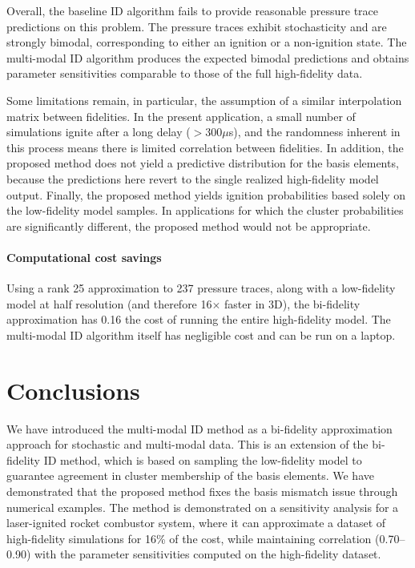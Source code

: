 \documentclass[preprint,10pt]{elsarticle}
\begin{document}
Overall, the baseline ID algorithm fails to provide reasonable pressure trace predictions on this problem. The pressure traces exhibit stochasticity and are strongly bimodal, corresponding to either an ignition or a non-ignition state. The multi-modal ID algorithm produces the expected bimodal predictions and obtains parameter sensitivities comparable to those of the full high-fidelity data. 

Some limitations remain, in particular, the assumption of a similar interpolation matrix between fidelities. In the present application, a small number of simulations ignite after a long delay ($>300\mu$s), and the randomness inherent in this process means there is limited correlation between fidelities. In addition, the proposed method does not yield a predictive distribution for the basis elements, because the predictions here revert to the single realized high-fidelity model output. Finally, the proposed method yields ignition probabilities based solely on the low-fidelity model samples. In applications for which the cluster probabilities are significantly different, the proposed method would not be appropriate.

\paragraph{Computational cost savings} Using a rank 25 approximation to 237 pressure traces, along with a low-fidelity model at half resolution (and therefore 16$\times$ faster in 3D), the bi-fidelity approximation has 0.16 the cost of running the entire high-fidelity model. The multi-modal ID algorithm itself has negligible cost and can be run on a laptop.



\section{Conclusions}

We have introduced the multi-modal ID method as a bi-fidelity approximation approach for stochastic and multi-modal data. This is an extension of the bi-fidelity ID method, which is based on sampling the low-fidelity model to guarantee agreement in cluster membership of the basis elements. We have demonstrated that the proposed method fixes the basis mismatch issue through numerical examples. The method is demonstrated on a sensitivity analysis for a laser-ignited rocket combustor system, where it can approximate a dataset of high-fidelity simulations for 16\% of the cost, while maintaining correlation (0.70--0.90) with the parameter sensitivities computed on the high-fidelity dataset.
\end{document}

